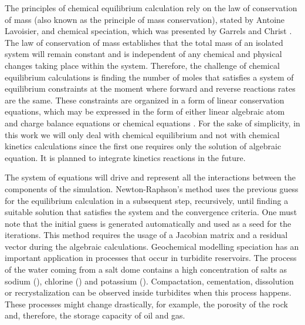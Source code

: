 \documentclass[ppgc,mestrado,English]{iiufrgs}
\begin{document}

The principles of chemical equilibrium calculation rely on the law of conservation of mass (also known as the principle of mass conservation), stated by Antoine Lavoisier, and chemical speciation, which was presented by Garrels and Christ  \cite{Garrels:65}. The law of conservation of mass establishes that the total mass of an isolated system will remain constant and is independent of any chemical and physical changes taking place within the system. Therefore, the challenge of chemical equilibrium calculations is finding the number of moles that satisfies a system of equilibrium constraints at the moment where forward and reverse reactions rates are the same. These constraints are organized in a form of linear conservation equations, which may be expressed in the form of either linear algebraic atom and charge balance equations or chemical equations \cite{SmithMissen83}. For the sake of simplicity, in this work we will only deal with chemical equilibrium and not with chemical kinetics calculations since the first one requires only the solution of algebraic equation. It is planned to integrate kinetics reactions in the future.


The system of equations will drive and represent all the interactions between the components of the simulation. Newton-Raphson's method uses the previous guess for the equilibrium calculation in a subsequent step, recursively, until finding a suitable solution that satisfies the system and the convergence criteria. One must note that the initial guess is generated automatically and used as a seed for the iterations. This method requires the usage of a Jacobian matrix and a residual vector during the algebraic calculations. Geochemical modelling speciation has an important application in processes that occur in turbidite reservoirs. The process of the water coming from a salt dome contains a high concentration of salts as sodium (), chlorine () and potassium (). Compactation, cementation, dissolution or recrystalization can be observed inside turbidites when this process happens. These processes might change drastically, for example, the porosity of the rock and, therefore, the storage capacity of oil and gas.

\end{document}
